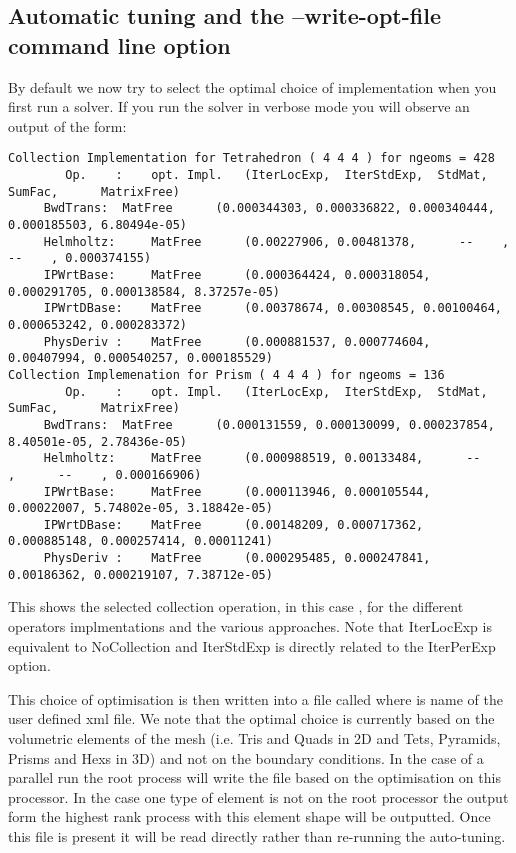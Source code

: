 \subsection{Automatic tuning and the --write-opt-file command line option}
By default we now try to select the optimal choice of implementation
when you first run a solver. If you run the solver in verbose mode you
will observe an output of the form:

\begin{lstlisting}[style=XmlStyle]
Collection Implementation for Tetrahedron ( 4 4 4 ) for ngeoms = 428
	    Op.    :	opt. Impl.	 (IterLocExp,  IterStdExp,  StdMat,     SumFac,      MatrixFree)
	 BwdTrans: 	MatFree   	 (0.000344303, 0.000336822, 0.000340444, 0.000185503, 6.80494e-05)
	 Helmholtz: 	MatFree   	 (0.00227906, 0.00481378,      --    ,      --    , 0.000374155)
	 IPWrtBase: 	MatFree   	 (0.000364424, 0.000318054, 0.000291705, 0.000138584, 8.37257e-05)
	 IPWrtDBase: 	MatFree   	 (0.00378674, 0.00308545, 0.00100464, 0.000653242, 0.000283372)
	 PhysDeriv : 	MatFree   	 (0.000881537, 0.000774604, 0.00407994, 0.000540257, 0.000185529)
Collection Implemenation for Prism ( 4 4 4 ) for ngeoms = 136
	    Op.    :	opt. Impl.	 (IterLocExp,  IterStdExp,  StdMat,     SumFac,      MatrixFree)
	 BwdTrans: 	MatFree   	 (0.000131559, 0.000130099, 0.000237854, 8.40501e-05, 2.78436e-05)
	 Helmholtz: 	MatFree   	 (0.000988519, 0.00133484,      --    ,      --    , 0.000166906)
	 IPWrtBase: 	MatFree   	 (0.000113946, 0.000105544, 0.00022007, 5.74802e-05, 3.18842e-05)
	 IPWrtDBase: 	MatFree   	 (0.00148209, 0.000717362, 0.000885148, 0.000257414, 0.00011241)
	 PhysDeriv : 	MatFree   	 (0.000295485, 0.000247841, 0.00186362, 0.000219107, 7.38712e-05)
\end{lstlisting}


This shows the selected collection operation, in this case
, for the different operators implmentations and the
various approaches. Note that IterLocExp is equivalent to NoCollection
and IterStdExp is directly related to the IterPerExp option.

This choice of optimisation is then written into a file called
 where  is name of the user defined
xml file. We note that the optimal choice is currently based on the
volumetric elements of the mesh (i.e. Tris and Quads in 2D and Tets,
Pyramids, Prisms and Hexs in 3D) and not on the boundary
conditions. In the case of a parallel run the root process will write
the file based on the optimisation on this processor. In the case one
type of element is not on the root processor the output form the
highest rank process with this element shape will be outputted.  Once
this file is present it will be read directly rather than re-running
the auto-tuning. 


